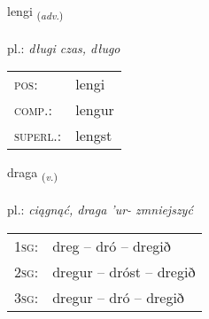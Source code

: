 \documentclass[frontgrid, backgrid]{flacards}\usepackage[]{graphicx}\usepackage[]{xcolor}
\begin{document}
\renewcommand{\blhead}{\vskip5pt {\small\bfseries\footnotesize Atviksorð | przysłówek }}
\renewcommand{\bcfoot}{\vskip5pt \hspace{2pt}{\small\bfseries\footnotesize 1K}}


{lengi \small{\textsubscript{(\textit{adv.})}} \\[1ex] %
\textphonetic{[leiɲcɪ]} \\
pl.: \emph{długi czas, długo} \\  [2ex]
\renewcommand*{\arraystretch}{0.8}
\begin{tabular}{ll}
\textsc{pos}: & lengi \\ 
\textsc{comp.}: & lengur \\ 
\textsc{superl.}: & lengst \\
\end{tabular}
}

\renewcommand{\flhead}{\vskip5pt \fboxsep=0pt {\small\bfseries\footnotesize Sagnorð | czasownik}}
\renewcommand{\fcfoot}{\vskip5pt \fboxsep=0pt \hspace{2pt}{\small\bfseries\footnotesize 1K}}

\renewcommand{\blhead}{\vskip5pt {\small\bfseries\footnotesize Sagnorð | czasownik }}
\renewcommand{\bcfoot}{\vskip5pt \hspace{2pt}{\small\bfseries\footnotesize 1K}}


{draga \small{\textsubscript{(\textit{v.})}} \\[1ex] %
\textphonetic{[traːɣa]} \\
pl.: \emph{ciągnąć, draga 'ur- zmniejszyć} \\  [2ex]
\renewcommand*{\arraystretch}{0.8}
\begin{tabular}{p{1cm}l}
\textsc{1sg}: & dreg -- dró -- dregið \\ 
\textsc{2sg}: & dregur -- dróst -- dregið \\ 
\textsc{3sg}: & dregur -- dró -- dregið \\ 
\end{tabular}
}
\end{document}
